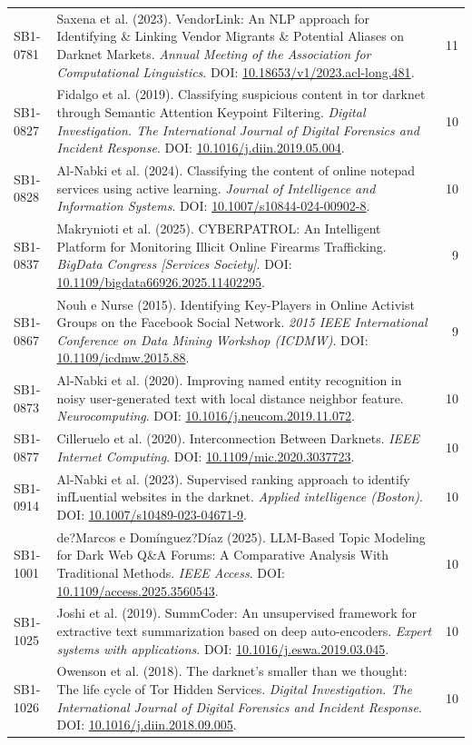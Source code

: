 \begin{small}
\begin{longtable}{lp{11.2cm}r}
SB1-0781 & Saxena et al. (2023). VendorLink: An NLP approach for Identifying \& Linking Vendor Migrants \& Potential Aliases on Darknet Markets. \textit{Annual Meeting of the Association for Computational Linguistics}. DOI: \url{10.18653/v1/2023.acl-long.481}. & 11 \\
SB1-0827 & Fidalgo et al. (2019). Classifying suspicious content in tor darknet through Semantic Attention Keypoint Filtering. \textit{Digital Investigation. The International Journal of Digital Forensics and Incident Response}. DOI: \url{10.1016/j.diin.2019.05.004}. & 10 \\
SB1-0828 & Al-Nabki et al. (2024). Classifying the content of online notepad services using active learning. \textit{Journal of Intelligence and Information Systems}. DOI: \url{10.1007/s10844-024-00902-8}. & 10 \\
SB1-0837 & Makrynioti et al. (2025). CYBERPATROL: An Intelligent Platform for Monitoring Illicit Online Firearms Trafficking. \textit{BigData Congress [Services Society]}. DOI: \url{10.1109/bigdata66926.2025.11402295}. & 9 \\
SB1-0867 & Nouh e Nurse (2015). Identifying Key-Players in Online Activist Groups on the Facebook Social Network. \textit{2015 IEEE International Conference on Data Mining Workshop (ICDMW)}. DOI: \url{10.1109/icdmw.2015.88}. & 9 \\
SB1-0873 & Al-Nabki et al. (2020). Improving named entity recognition in noisy user-generated text with local distance neighbor feature. \textit{Neurocomputing}. DOI: \url{10.1016/j.neucom.2019.11.072}. & 10 \\
SB1-0877 & Cilleruelo et al. (2020). Interconnection Between Darknets. \textit{IEEE Internet Computing}. DOI: \url{10.1109/mic.2020.3037723}. & 10 \\
SB1-0914 & Al-Nabki et al. (2023). Supervised ranking approach to identify infLuential websites in the darknet. \textit{Applied intelligence (Boston)}. DOI: \url{10.1007/s10489-023-04671-9}. & 10 \\
SB1-1001 & de?Marcos e Domínguez?Díaz (2025). LLM-Based Topic Modeling for Dark Web Q\&A Forums: A Comparative Analysis With Traditional Methods. \textit{IEEE Access}. DOI: \url{10.1109/access.2025.3560543}. & 10 \\
SB1-1025 & Joshi et al. (2019). SummCoder: An unsupervised framework for extractive text summarization based on deep auto-encoders. \textit{Expert systems with applications}. DOI: \url{10.1016/j.eswa.2019.03.045}. & 10 \\
SB1-1026 & Owenson et al. (2018). The darknet's smaller than we thought: The life cycle of Tor Hidden Services. \textit{Digital Investigation. The International Journal of Digital Forensics and Incident Response}. DOI: \url{10.1016/j.diin.2018.09.005}. & 10 \\
\hline
\end{longtable}
\end{small}